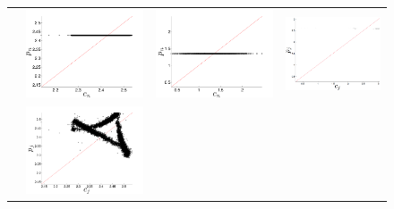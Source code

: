 \begin{figure}
\begin{tabular}{m{}|CCC}
     &
    \includegraphics[width=0.6\columnwidth]{figs/colMeanForecast} &
    \includegraphics[width=0.6\columnwidth]{figs/gccMeanForecast} &
    \includegraphics[width=0.6\columnwidth]{figs/svdfiveMeanForecast} \\
     &
    \includegraphics[width=0.6\columnwidth]{figs/colARIMAForecast} &

\end{tabular}
\end{figure}

